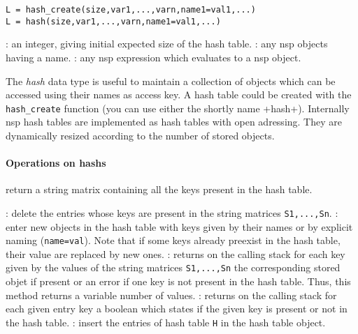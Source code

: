 
\begin{mandesc}
\end{mandesc}

\begin{calling_sequence}
\begin{verbatim}
L = hash_create(size,var1,...,varn,name1=val1,...)
L = hash(size,var1,...,varn,name1=val1,...)
\end{verbatim}
\end{calling_sequence}
\begin{parameters}
  \begin{varlist}
    : an integer, giving initial expected size of the hash table.
    :  any nsp objects having a name. 
    : any nsp expression which evaluates to a nsp object.
  \end{varlist}
\end{parameters}

\begin{mandescription}
The \emph{hash} data type is useful to maintain a collection of objects 
which can be accessed using their names as access key. A hash table
could be created with the \verb+hash_create+ function (you can use
either the shortly name +hash+).  
Internally nsp hash tables are implemented as hash tables with open adressing. 
They are dynamically resized according to the number of stored
objects.

\end{mandescription}

\paragraph{Operations on hashs}
  \begin{varlist}
     return a string matrix containing all the keys present in the hash 
    table.
  \end{varlist}

  \begin{varlist}
  : delete the entries whose keys are present in the string matrices 
  \verb+S1,...,Sn+.
  : enter new objects in the hash table with keys 
  given by their names or by explicit naming (\verb+name=val+). Note that if some keys 
  already preexist in the hash table, their value are replaced by new ones. 
  : returns on the calling stack for each key given by the values of 
  the string matrices \verb+S1,...,Sn+ the corresponding stored objet if present or an 
  error if one key is not present in the hash table. Thus, this method returns a variable 
  number of values. 
  : returns on the calling stack for each given entry key a boolean 
  which states if the given key is present or not in the hash table.
  : insert the entries of hash table \verb+H+ in the hash table object.
  \end{varlist}

